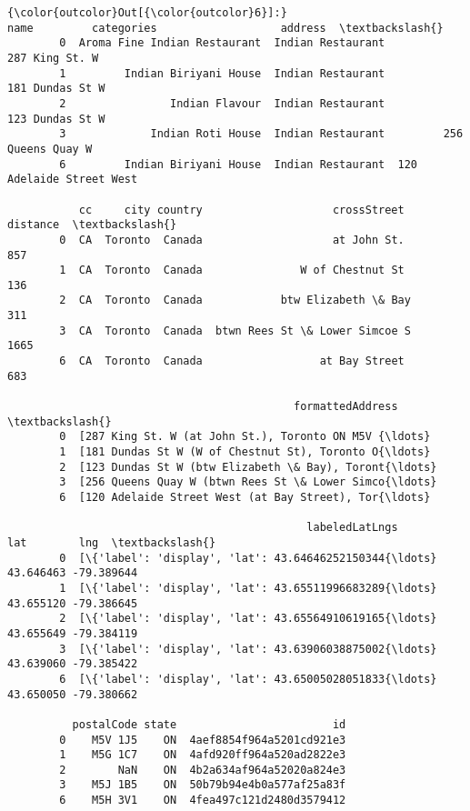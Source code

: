 \documentclass[11pt]{article}
\begin{document}
\begin{Verbatim}[commandchars=\\\{\}]
{\color{outcolor}Out[{\color{outcolor}6}]:}                            name         categories                   address  \textbackslash{}
        0  Aroma Fine Indian Restaurant  Indian Restaurant            287 King St. W   
        1         Indian Biriyani House  Indian Restaurant           181 Dundas St W   
        2                Indian Flavour  Indian Restaurant           123 Dundas St W   
        3             Indian Roti House  Indian Restaurant         256 Queens Quay W   
        6         Indian Biriyani House  Indian Restaurant  120 Adelaide Street West   
        
           cc     city country                    crossStreet  distance  \textbackslash{}
        0  CA  Toronto  Canada                    at John St.       857   
        1  CA  Toronto  Canada               W of Chestnut St       136   
        2  CA  Toronto  Canada            btw Elizabeth \& Bay       311   
        3  CA  Toronto  Canada  btwn Rees St \& Lower Simcoe S      1665   
        6  CA  Toronto  Canada                  at Bay Street       683   
        
                                            formattedAddress  \textbackslash{}
        0  [287 King St. W (at John St.), Toronto ON M5V {\ldots}   
        1  [181 Dundas St W (W of Chestnut St), Toronto O{\ldots}   
        2  [123 Dundas St W (btw Elizabeth \& Bay), Toront{\ldots}   
        3  [256 Queens Quay W (btwn Rees St \& Lower Simco{\ldots}   
        6  [120 Adelaide Street West (at Bay Street), Tor{\ldots}   
        
                                              labeledLatLngs        lat        lng  \textbackslash{}
        0  [\{'label': 'display', 'lat': 43.64646252150344{\ldots}  43.646463 -79.389644   
        1  [\{'label': 'display', 'lat': 43.65511996683289{\ldots}  43.655120 -79.386645   
        2  [\{'label': 'display', 'lat': 43.65564910619165{\ldots}  43.655649 -79.384119   
        3  [\{'label': 'display', 'lat': 43.63906038875002{\ldots}  43.639060 -79.385422   
        6  [\{'label': 'display', 'lat': 43.65005028051833{\ldots}  43.650050 -79.380662   
        
          postalCode state                        id  
        0    M5V 1J5    ON  4aef8854f964a5201cd921e3  
        1    M5G 1C7    ON  4afd920ff964a520ad2822e3  
        2        NaN    ON  4b2a634af964a52020a824e3  
        3    M5J 1B5    ON  50b79b94e4b0a577af25a83f  
        6    M5H 3V1    ON  4fea497c121d2480d3579412  
\end{Verbatim}
            
\end{document}
